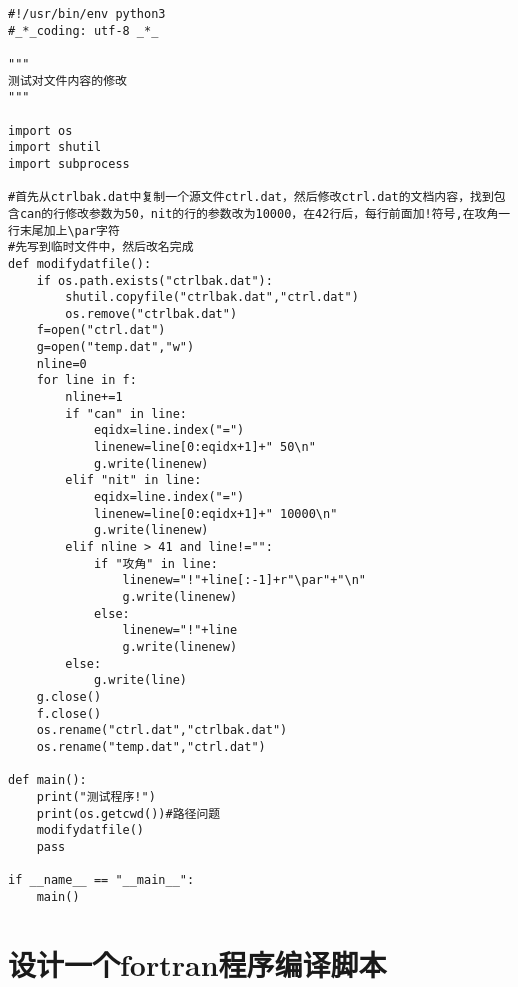 \documentclass[twoside,11pt]{book}
\begin{document}
\begin{lstlisting}
#!/usr/bin/env python3
#_*_coding: utf-8 _*_

"""
测试对文件内容的修改
"""

import os
import shutil
import subprocess

#首先从ctrlbak.dat中复制一个源文件ctrl.dat，然后修改ctrl.dat的文档内容，找到包含can的行修改参数为50，nit的行的参数改为10000，在42行后，每行前面加!符号,在攻角一行末尾加上\par字符
#先写到临时文件中，然后改名完成
def modifydatfile():
    if os.path.exists("ctrlbak.dat"):
        shutil.copyfile("ctrlbak.dat","ctrl.dat")
        os.remove("ctrlbak.dat")
    f=open("ctrl.dat")
    g=open("temp.dat","w")
    nline=0
    for line in f:
        nline+=1
        if "can" in line:
            eqidx=line.index("=")
            linenew=line[0:eqidx+1]+" 50\n"
            g.write(linenew)
        elif "nit" in line:
            eqidx=line.index("=")
            linenew=line[0:eqidx+1]+" 10000\n"
            g.write(linenew)
        elif nline > 41 and line!="":
            if "攻角" in line:
                linenew="!"+line[:-1]+r"\par"+"\n"
                g.write(linenew)
            else:
                linenew="!"+line
                g.write(linenew)
        else:
            g.write(line)
    g.close()
    f.close()
    os.rename("ctrl.dat","ctrlbak.dat")
    os.rename("temp.dat","ctrl.dat")

def main():
    print("测试程序!")
    print(os.getcwd())#路径问题
    modifydatfile()
    pass

if __name__ == "__main__":
    main()
\end{lstlisting}


\section{设计一个fortran程序编译脚本}
\end{document}

